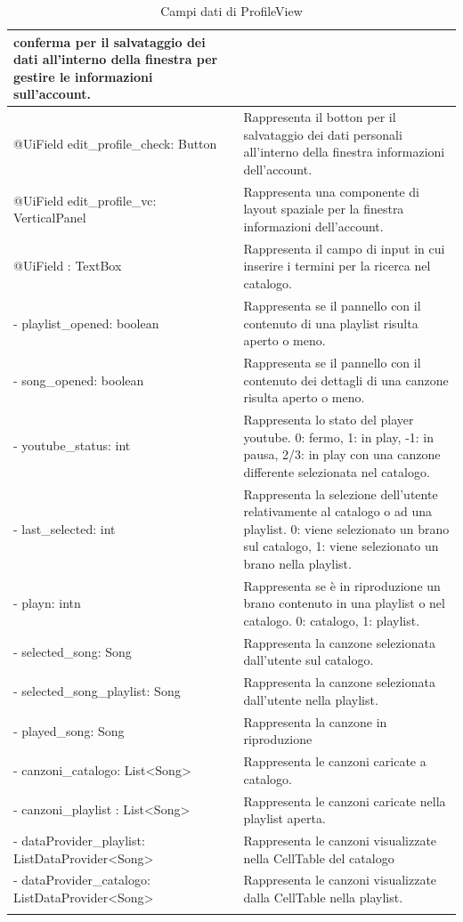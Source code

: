 \begin{longtable}{|p{}|p{}|}
conferma per il salvataggio dei dati all'interno della finestra per
gestire le informazioni sull'account.\\\hline
@UiField edit\_profile\_check: Button & Rappresenta il botton per il
salvataggio dei dati personali all'interno della finestra informazioni
dell'account.\\\hline
@UiField edit\_profile\_vc: VerticalPanel & Rappresenta una componente di layout
spaziale per la finestra informazioni dell'account.\\\hline
@UiField : TextBox & Rappresenta il campo di input in cui inserire i
termini per la ricerca nel catalogo.\\\hline
- playlist\_opened: boolean & Rappresenta se il pannello con il contenuto di una
playlist risulta aperto o meno. \\\hline
- song\_opened: boolean & Rappresenta se il pannello con il contenuto dei
dettagli di una canzone risulta aperto o meno. \\\hline
- youtube\_status: int & Rappresenta lo stato del player youtube. 0: fermo, 1:
in play, -1: in pausa, 2/3: in play con una canzone differente selezionata nel
catalogo. \\\hline
- last\_selected: int & Rappresenta la selezione dell'utente relativamente al
catalogo o ad una playlist. 0: viene selezionato un brano sul catalogo, 1: viene
selezionato un brano nella playlist. \\\hline
- playn: intn & Rappresenta se \`e in riproduzione un brano contenuto in una
playlist o nel catalogo. 0: catalogo, 1: playlist. \\\hline
- selected\_song: Song & Rappresenta la canzone selezionata dall'utente sul
catalogo. \\\hline
- selected\_song\_playlist: Song & Rappresenta la canzone selezionata
dall'utente nella playlist.\\\hline
- played\_song: Song & Rappresenta la canzone in riproduzione\\\hline
- canzoni\_catalogo: List\textless Song\textgreater & Rappresenta le
canzoni caricate a catalogo.\\\hline
- canzoni\_playlist : List\textless Song\textgreater & Rappresenta le
canzoni caricate nella playlist aperta.\\\hline - dataProvider\_playlist:
ListDataProvider\textless Song\textgreater & Rappresenta le canzoni
visualizzate nella CellTable del catalogo\\\hline - dataProvider\_catalogo:
ListDataProvider\textless Song\textgreater & Rappresenta le canzoni visualizzate
dalla CellTable nella playlist.\\\hline
\caption{Campi dati di ProfileView}
\end{longtable}
